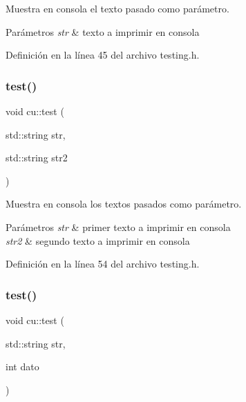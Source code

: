 Muestra en consola el texto pasado como parámetro. 


\begin{DoxyParams}{Parámetros}
{\em str} & texto a imprimir en consola \\
\hline
\end{DoxyParams}


Definición en la línea 45 del archivo testing.\+h.

\mbox{\label{namespacecu_a29c88a60e2e11b522402097bac91dd53}} 
\subsubsection{\texorpdfstring{test()}{test()}\hspace{0.1cm}{\footnotesize\ttfamily [2/6]}}
{\footnotesize\ttfamily void cu\+::test (\begin{DoxyParamCaption}\item[{std\+::string}]{str,  }\item[{std\+::string}]{str2 }\end{DoxyParamCaption})}



Muestra en consola los textos pasados como parámetro. 


\begin{DoxyParams}{Parámetros}
{\em str} & primer texto a imprimir en consola \\
\hline
{\em str2} & segundo texto a imprimir en consola \\
\hline
\end{DoxyParams}


Definición en la línea 54 del archivo testing.\+h.

\mbox{\label{namespacecu_a204c06884ca90cec812a74a79978ad1b}} 
\subsubsection{\texorpdfstring{test()}{test()}\hspace{0.1cm}{\footnotesize\ttfamily [3/6]}}
{\footnotesize\ttfamily void cu\+::test (\begin{DoxyParamCaption}\item[{std\+::string}]{str,  }\item[{int}]{dato }\end{DoxyParamCaption})}



